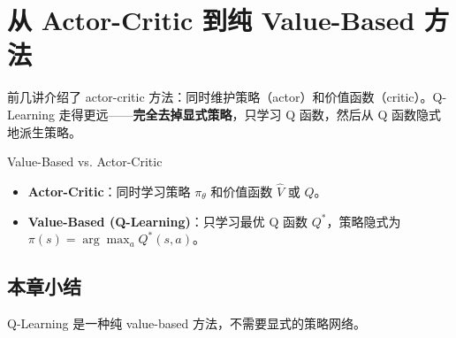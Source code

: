 \section{从 Actor-Critic 到纯 Value-Based 方法}

前几讲介绍了 actor-critic 方法：同时维护策略（actor）和价值函数（critic）。Q-Learning 走得更远——\textbf{完全去掉显式策略}，只学习 Q 函数，然后从 Q 函数隐式地派生策略。

\begin{knowledgebox}{Value-Based vs. Actor-Critic}
\begin{itemize}
    \item \textbf{Actor-Critic}：同时学习策略 $\pi_\theta$ 和价值函数 $\hat{V}$ 或 $\hat{Q}$。
    \item \textbf{Value-Based (Q-Learning)}：只学习最优 Q 函数 $Q^*$，策略隐式为 $\pi(s) = \arg\max_a Q^*(s, a)$。
\end{itemize}
\end{knowledgebox}

\subsection{本章小结}

Q-Learning 是一种纯 value-based 方法，不需要显式的策略网络。

